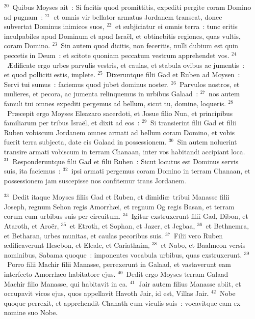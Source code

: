 ${}^{20}$~Quibus Moyses ait~: Si facitis quod promittitis, expediti pergite coram Domino ad pugnam~:
${}^{21}$~et omnis vir bellator armatus Jordanem transeat, donec subvertat Dominus inimicos suos,
${}^{22}$~et subjiciatur ei omnis terra~: tunc eritis inculpabiles apud Dominum et apud Isra\"el, et obtinebitis regiones, quas vultis, coram Domino.
${}^{23}$~Sin autem quod dicitis, non feceritis, nulli dubium est quin peccetis in Deum~: et scitote quoniam peccatum vestrum apprehendet vos.
${}^{24}$~\AE dificate ergo urbes parvulis vestris, et caulas, et stabula ovibus ac jumentis~: et quod polliciti estis, implete.
${}^{25}$~Dixeruntque filii Gad et Ruben ad Moysen~: Servi tui sumus~: faciemus quod jubet dominus noster.
${}^{26}$~Parvulos nostros, et mulieres, et pecora, ac jumenta relinquemus in urbibus Galaad~:
${}^{27}$~nos autem famuli tui omnes expediti pergemus ad bellum, sicut tu, domine, loqueris.
${}^{28}$~Pr\ae cepit ergo Moyses Eleazaro sacerdoti, et Josue filio Nun, et principibus familiarum per tribus Isra\"el, et dixit ad eos~:
${}^{29}$~Si transierint filii Gad et filii Ruben vobiscum Jordanem omnes armati ad bellum coram Domino, et vobis fuerit terra subjecta, date eis Galaad in possessionem.
${}^{30}$~Sin autem noluerint transire armati vobiscum in terram Chanaan, inter vos habitandi accipiant loca.
${}^{31}$~Responderuntque filii Gad et filii Ruben~: Sicut locutus est Dominus servis suis, ita faciemus~:
${}^{32}$~ipsi armati pergemus coram Domino in terram Chanaan, et possessionem jam suscepisse nos confitemur trans Jordanem.


${}^{33}$~Dedit itaque Moyses filiis Gad et Ruben, et dimidi\ae\ tribui Manasse filii Joseph, regnum Sehon regis Amorrh\ae i, et regnum Og regis Basan, et terram eorum cum urbibus suis per circuitum.
${}^{34}$~Igitur exstruxerunt filii Gad, Dibon, et Ataroth, et Aro\"er,
${}^{35}$~et Etroth, et Sophan, et Jazer, et Jegbaa,
${}^{36}$~et Bethnemra, et Betharan, urbes munitas, et caulas pecoribus suis.
${}^{37}$~Filii vero Ruben \ae dificaverunt Hesebon, et Eleale, et Cariathaim,
${}^{38}$~et Nabo, et Baalmeon versis nominibus, Sabama quoque~: imponentes vocabula urbibus, quas exstruxerunt.
${}^{39}$~Porro filii Machir filii Manasse, perrexerunt in Galaad, et vastaverunt eam interfecto Amorrh\ae o habitatore ejus.
${}^{40}$~Dedit ergo Moyses terram Galaad Machir filio Manasse, qui habitavit in ea.
${}^{41}$~Jair autem filius Manasse abiit, et occupavit vicos ejus, quos appellavit Havoth Jair, id est, Villas Jair.
${}^{42}$~Nobe quoque perrexit, et apprehendit Chanath cum viculis suis~: vocavitque eam ex nomine suo Nobe.

